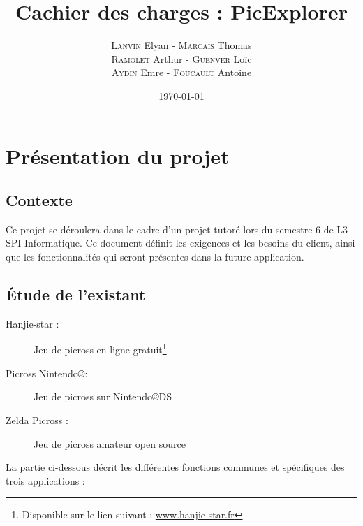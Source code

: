 \documentclass[a4paper, 12pt, twoside]{article}
\title{Cachier des charges : PicExplorer}
\author{\textsc{Lanvin} Elyan - \textsc{Marcais} Thomas\\ \textsc{Ramolet} Arthur - \textsc{Guenver} Loïc\\ \textsc{Aydin} Emre - \textsc{Foucault} Antoine}
\date{\today}
\begin{document}
\pagestyle{fancy}
\lhead{}
\chead{}
\rhead{\leftmark}
\cfoot{}

\clearpage
\maketitle
\thispagestyle{empty}
\newpage

\renewcommand{\contentsname}{Sommaire}
\tableofcontents
\newpage

\section{Présentation du projet}

\subsection{Contexte}

Ce projet se déroulera dans le cadre d'un projet tutoré lors du semestre 6 de L3 SPI Informatique. Ce document définit les exigences et les besoins du client, ainsi que les fonctionnalités qui seront présentes dans la future application.

\subsection{Étude de l'existant}

\begin{description}

  \item[Hanjie-star :] Jeu de picross en ligne gratuit\footnote{Disponible sur le lien suivant : \url{www.hanjie-star.fr}}
  \item[Picross Nintendo\copyright :]  Jeu de picross sur Nintendo\copyright \space DS
  \item[Zelda Picross :] Jeu de picross amateur open source

\end{description}

La partie ci-dessous décrit les différentes fonctions communes et spécifiques des trois applications : \newline
\end{document}
